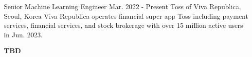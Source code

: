 

\begin{cventries}
    \cventry
        {Senior Machine Learning Engineer} %
        {Mar. 2022 - Present} %
        {Toss of Viva Republica, } %
        {Seoul, Korea}%
        { %
            Viva Republica operates financial super app Toss including payment services, financial services, and stock brokerage with over 15 million active users in Jun. 2023.
        }
        { %
            \begin{cvitems}
                \item {
                    {\bf TBD} \\
                }
            \end{cvitems}
        }


\end{cventries}
